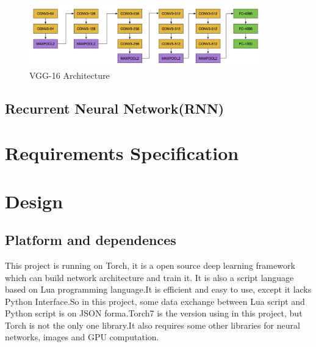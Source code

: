 \documentclass[12pt,a4paper]{report}
\begin{document}
\begin{itemize}
\begin{figure}[h]
\centering
\includegraphics[width=0.9\textwidth]{vgg16.png}
\caption{VGG-16 Architecture}
\end{figure}

\end{itemize}
\newpage
\subsection{Recurrent Neural Network(RNN)}



\section{Requirements Specification}

\section{Design}

\subsection{Platform and dependences}
This project is running on Torch, it is a open source deep learning framework which can build network architecture and train it. It is also a script language based on Lua programming language.It is efficient and easy to use, except it lacks Python Interface.So in this project, some data exchange between Lua script and Python script is on JSON forma.Torch7 is the version using in this project, but Torch is not the only one library.It also requires some other libraries for neural networks, images and GPU computation.
\end{document}
